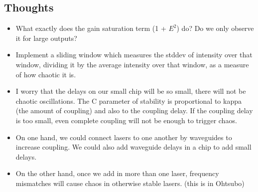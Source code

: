 \documentclass[11pt,letterpaper]{article}
\begin{document}
\subsection{Thoughts}
\begin{itemize}
    \item What exactly does the gain saturation term (1 + $E^2$) do? Do we only observe it for large outputs?
    \item Implement a sliding window which measures the stddev of intensity over that window, dividing it by the average intensity over that window, as a measure of how chaotic it is.
    \item I worry that the delays on our small chip will be so small, there will not be chaotic oscillations. The C parameter of stability is proportional to kappa (the amount of coupling) and also to the coupling delay. If the coupling delay is too small, even complete coupling will not be enough to trigger chaos.
    \item On one hand, we could connect lasers to one another by waveguides to increase coupling. We could also add waveguide delays in a chip to add small delays.
    \item On the other hand, once we add in more than one laser, frequency mismatches will cause chaos in otherwise stable lasers. (this is in Ohtsubo)
\end{itemize}

 
\end{document}
